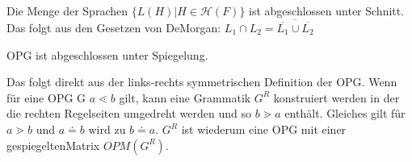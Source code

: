\begin{corollary}[Schnitt]
Die Menge der Sprachen $\{L(H)|H \in \mathcal{H}(F)\}$ ist abgeschlossen unter Schnitt.\\ Das folgt aus den Gesetzen von DeMorgan: 
$L_1 \cap L_2 = \overline{ \overline{L_1}\cup \overline{L_2}  }$
\end{corollary}

\begin{theorem}[Spiegelung]
OPG ist abgeschlossen unter Spiegelung.
\end{theorem}
Das folgt direkt aus der links-rechts symmetrischen Definition der OPG. Wenn für eine OPG G $a \lessdot b$ gilt, kann eine Grammatik $G^R$ konstruiert werden in der die rechten Regelseiten umgedreht werden und so $b \gtrdot a$ enthält. Gleiches gilt für $a \gtrdot b$ und $a \doteq b$ wird zu $b \doteq a$. $G^R$ ist wiederum eine OPG mit einer \glqq gespiegelten\grqq Matrix $OPM(G^R)$.

